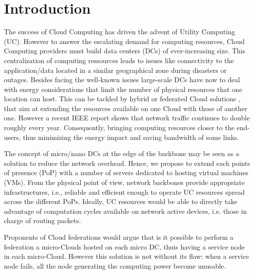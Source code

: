\section{Introduction}
\label{sec:intro} 



The success of Cloud Computing has driven the advent of Utility Computing (UC). 
However to answer the escalating demand for computing resources, 
Cloud Computing providers must build data centers (DCs) of ever-increasing size.
This centralization of computing ressources leads to issues like connectivity to
the application/data located in a similar geographical zone during disasters or
outages. Besides facing the well-known issues large-scale DCs have now to deal 
with energy considerations that limit the number of physical resources that one 
location can host. This can be tackled by hybrid or federated Cloud solutions 
\cite{armbrust:2010}, that aim at extending the resources available on one Cloud
with those of another one. However a recent IEEE report 
\cite{ieeenetreport:2012} shows that network traffic continues to double 
roughly every year. Consequently, bringing computing resources closer to the 
end-users, thus minimizing the energy impact and saving bandwidth of some links.

The concept of micro/nano DCs at the edge of the backbone \cite{greenberg:2008} 
may be seen as a solution to reduce the network overhead. Hence, we propose to 
extend each points of presence (PoP) with a number of servers dedicated to 
hosting virtual machines (VMs). From the physical point of view, network 
backbones provide appropriate infrastructures, i.e., reliable and efficient 
enough to operate UC resources spread across the different PoPs. Ideally, UC 
resources would be able to directly take advantage of computation cycles 
available on network active devices, i.e. those in charge of routing packets.

Proponents of Cloud federations would argue that is it possible to perform
a federation a micro-Clouds hosted on each micro DC, thuis having a service node
in each micro-Cloud. However this solution is not without its flaw: when a 
service node fails, all the node generating the computing power become unusable.

